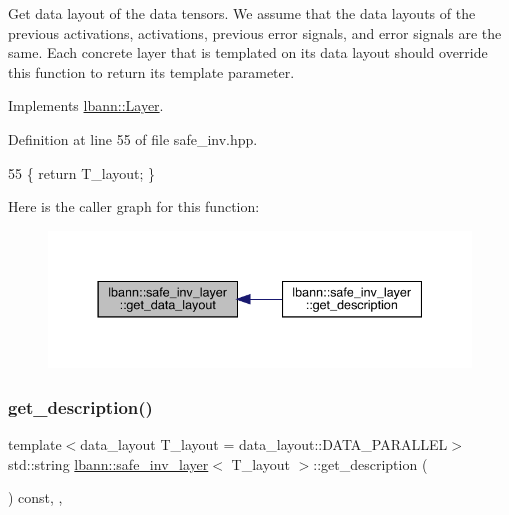 Get data layout of the data tensors. We assume that the data layouts of the previous activations, activations, previous error signals, and error signals are the same. Each concrete layer that is templated on its data layout should override this function to return its template parameter. 

Implements \hyperlink{classlbann_1_1Layer_a5dfb66e81fc085997402a5e2241316bd}{lbann\+::\+Layer}.



Definition at line 55 of file safe\+\_\+inv.\+hpp.


\begin{DoxyCode}
55 \{ \textcolor{keywordflow}{return} T\_layout; \}
\end{DoxyCode}
Here is the caller graph for this function\+:\nopagebreak
\begin{figure}[H]
\begin{center}
\leavevmode
\includegraphics[width=337pt]{classlbann_1_1safe__inv__layer_aa82e763a902004d7b0f05b390c3bd45f_icgraph}
\end{center}
\end{figure}
\mbox{\label{classlbann_1_1safe__inv__layer_a1823f1ac48228eec1fa0c1578b2b1ab3}} 
\subsubsection{\texorpdfstring{get\+\_\+description()}{get\_description()}}
{\footnotesize\ttfamily template$<$data\+\_\+layout T\+\_\+layout = data\+\_\+layout\+::\+D\+A\+T\+A\+\_\+\+P\+A\+R\+A\+L\+L\+EL$>$ \\
std\+::string \hyperlink{classlbann_1_1safe__inv__layer}{lbann\+::safe\+\_\+inv\+\_\+layer}$<$ T\+\_\+layout $>$\+::get\+\_\+description (\begin{DoxyParamCaption}{ }\end{DoxyParamCaption}) const\hspace{0.3cm}{\ttfamily [inline]}, {\ttfamily [override]}, {\ttfamily [virtual]}}

